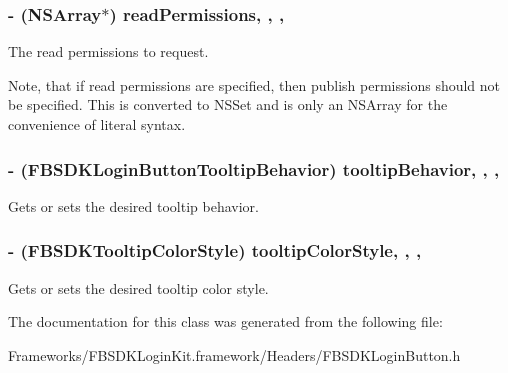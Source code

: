 \subsubsection[{read\+Permissions}]{\setlength{\rightskip}{0pt plus 5cm}-\/ (N\+S\+Array$\ast$) read\+Permissions\hspace{0.3cm}{\ttfamily [read]}, {\ttfamily [write]}, {\ttfamily [nonatomic]}, {\ttfamily [copy]}}\label{interface_f_b_s_d_k_login_button_a4086baec0d0b3203c6dd3b3d65d419f8}
The read permissions to request.

Note, that if read permissions are specified, then publish permissions should not be specified. This is converted to N\+S\+Set and is only an N\+S\+Array for the convenience of literal syntax. \hypertarget{interface_f_b_s_d_k_login_button_ad8da738c3ec8c6efbdada9547ef09757}{}
\subsubsection[{tooltip\+Behavior}]{\setlength{\rightskip}{0pt plus 5cm}-\/ (F\+B\+S\+D\+K\+Login\+Button\+Tooltip\+Behavior) tooltip\+Behavior\hspace{0.3cm}{\ttfamily [read]}, {\ttfamily [write]}, {\ttfamily [nonatomic]}, {\ttfamily [assign]}}\label{interface_f_b_s_d_k_login_button_ad8da738c3ec8c6efbdada9547ef09757}
Gets or sets the desired tooltip behavior. \hypertarget{interface_f_b_s_d_k_login_button_af2e1aa50591714452427fc87eade3e5e}{}
\subsubsection[{tooltip\+Color\+Style}]{\setlength{\rightskip}{0pt plus 5cm}-\/ (F\+B\+S\+D\+K\+Tooltip\+Color\+Style) tooltip\+Color\+Style\hspace{0.3cm}{\ttfamily [read]}, {\ttfamily [write]}, {\ttfamily [nonatomic]}, {\ttfamily [assign]}}\label{interface_f_b_s_d_k_login_button_af2e1aa50591714452427fc87eade3e5e}
Gets or sets the desired tooltip color style. 

The documentation for this class was generated from the following file\+:\begin{DoxyCompactItemize}
\item 
Frameworks/\+F\+B\+S\+D\+K\+Login\+Kit.\+framework/\+Headers/F\+B\+S\+D\+K\+Login\+Button.\+h\end{DoxyCompactItemize}
